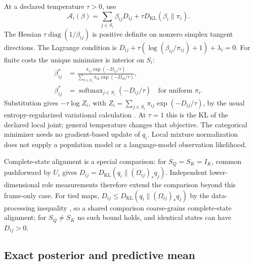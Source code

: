 \documentclass[twoside,11pt]{article}
\begin{document}
At a declared temperature $\tau>0$, use
\begin{equation}
\mathcal A_i(\beta)=\sum_{j\in S_i}\beta_{ij}D_{ij}
+\tau D_{\mathrm{KL}}(\beta_i\|\pi_i).
\label{eq:F_align_canonical_tau}
\end{equation}
The Hessian $\tau\operatorname{diag}(1/\beta_{ij})$ is positive definite on nonzero simplex tangent directions. The Lagrange condition is
$D_{ij}+\tau(\log(\beta_{ij}/\pi_{ij})+1)+\lambda_i=0$.
For finite costs the unique minimizer is interior on $S_i$:
\begin{align}
\beta_{ij}^*&=\frac{\pi_{ij}\exp(-D_{ij}/\tau)}
{\sum_{k\in S_i}\pi_{ik}\exp(-D_{ik}/\tau)},
\label{eq:mixture_softmax_general}\\
\beta_{ij}^*&=\operatorname{softmax}_{j\in S_i}(-D_{ij}/\tau)
\quad\text{for uniform }\pi_i.
\label{eq:mixture_softmax}
\end{align}
Substitution gives $-\tau\log Z_i$, with
$Z_i=\sum_{j\in S_i}\pi_{ij}\exp(-D_{ij}/\tau)$, by the usual entropy-regularized variational calculation \citep{Boyd2004,Wainwright2008,Niculae2017Regularized}.
At $\tau=1$ this is the KL of the declared local joint; general temperature changes that objective. The categorical minimizer needs no gradient-based update of $q_i$. Local mixture normalization does not supply a population model or a language-model observation likelihood.

Complete-state alignment is a special comparison: for $S_Q=S_K=I_K$, common pushforward by $U_i$ gives
$D_{ij}=D_{\mathrm{KL}}(q_i\|(\Omega_{ij})_*q_j)$.
Independent lower-dimensional role measurements therefore extend the comparison beyond this frame-only case. For tied maps, $D_{ij}\le D_{\mathrm{KL}}(q_i\|(\Omega_{ij})_*q_j)$ by the data-processing inequality \citep[Thm.~9]{vanErvenHarremoes2014}, so a shared comparison coarse-grains complete-state alignment; for $S_Q\ne S_K$ no such bound holds, and identical states can have $D_{ij}>0$.

\subsection{Exact posterior and predictive mean}
\label{sec:exact_posterior}
\end{document}
